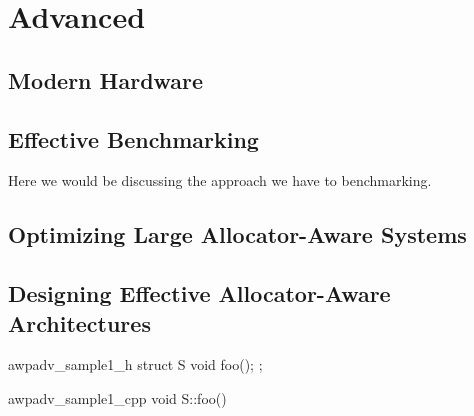 \chapter{Advanced}
\section{Modern Hardware}
\section{Effective Benchmarking}

Here we would be discussing the approach we have to benchmarking.  

\section{Optimizing Large Allocator-Aware Systems}
\section{Designing Effective Allocator-Aware Architectures}

\begin{cppcodeblock}{awpadv_sample1_h}
  struct S {
    void foo();
  };
\end{cppcodeblock}

\begin{cppcodeblock}{awpadv_sample1_cpp}
  void S::foo()
  {
  }
\end{cppcodeblock}
